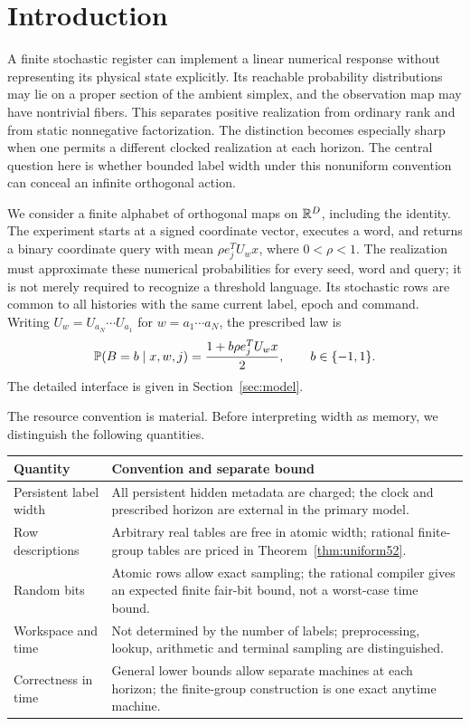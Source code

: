 \section{Introduction}\label{sec:introduction51}
A finite stochastic register can implement a linear numerical response
without representing its physical state explicitly. Its reachable
probability distributions may lie on a proper section of the ambient
simplex, and the observation map may have nontrivial fibers. This
separates positive realization from ordinary rank and from static
nonnegative factorization. The distinction becomes especially sharp
when one permits a different clocked realization at each horizon.
The central question here is whether bounded label width under this
nonuniform convention can conceal an infinite orthogonal action.

We consider a finite alphabet of orthogonal maps on $\mathbb R^D$, including
the identity. The experiment starts at a signed coordinate vector,
executes a word, and returns a binary coordinate query with mean
$\rho e_j^TU_wx$, where $0<\rho<1$. The realization must approximate
these numerical probabilities for every seed, word and query; it is
not merely required to recognize a threshold language. Its stochastic
rows are common to all histories with the same current label, epoch
and command. Writing $U_w=U_{a_N}\cdots U_{a_1}$ for $w=a_1\cdots a_N$,
the prescribed law is
\begin{equation}\label{eq:target}
 \mathbb P(B=b\mid x,w,j)=\frac{1+b\rho e_j^TU_wx}{2},\qquad b\in\{-1,1\}.
\end{equation}
The detailed interface is given in Section~\ref{sec:model}.

The resource convention is material. Before interpreting width as
memory, we distinguish the following quantities.
\begin{center}\small
\begin{tabular}{p{}p{}}
\toprule
Quantity & Convention and separate bound\\
\midrule
Persistent label width & All persistent hidden metadata are charged;
 the clock and prescribed horizon are external in the primary model.\\
Row descriptions & Arbitrary real tables are free in atomic width;
 rational finite-group tables are priced in Theorem~\ref{thm:uniform52}.\\
Random bits & Atomic rows allow exact sampling; the rational compiler
 gives an expected finite fair-bit bound, not a worst-case time bound.\\
Workspace and time & Not determined by the number of labels;
 preprocessing, lookup, arithmetic and terminal sampling are distinguished.\\
Correctness in time & General lower bounds allow separate machines at
 each horizon; the finite-group construction is one exact anytime machine.\\
\bottomrule
\end{tabular}
\end{center}

